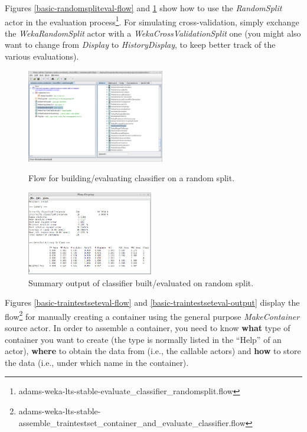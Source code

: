Figures \ref{basic-randomspliteval-flow} and \ref{basic-randomspliteval-output}
show how to use the \textit{RandomSplit} actor in the evaluation
process\footnote{adams-weka-lts-stable-evaluate\_classifier\_randomsplit.flow}. For
simulating cross-validation, simply exchange the \textit{WekaRandomSplit} actor
with a \textit{WekaCrossValidationSplit} one (you might also want to change from
\textit{Display} to \textit{HistoryDisplay}, to keep better track of the various
evaluations).

\begin{figure}[ht]
  \begin{minipage}[t]{0.5\linewidth}
    \centering
    \includegraphics[width=6.0cm]{images/basic-randomspliteval-flow.png}
    \caption{Flow for building/evaluating classifier on a random split.}
    \label{basic-randomspliteval-flow}
  \end{minipage}
  \hspace{0.5cm}
  \begin{minipage}[t]{0.5\linewidth}
    \centering
    \includegraphics[width=5.5cm]{images/basic-randomspliteval-output.png}
    \caption{Summary output of classifier built/evaluated on random split.}
    \label{basic-randomspliteval-output}
  \end{minipage}
\end{figure}

Figures \ref{basic-traintestseteval-flow} and
\ref{basic-traintestseteval-output} display the flow\footnote{adams-weka-lts-stable-assemble\_traintestset\_container\_and\_evaluate\_classifier.flow}
for manually creating a container using the general purpose
\textit{MakeContainer} source actor. In order to assemble a container, you need
to know \textbf{what} type of container you want to create (the type is normally
listed in the ``Help'' of an actor), \textbf{where} to obtain the data from
(i.e., the callable actors) and \textbf{how} to store the data (i.e., under which
name in the container).

